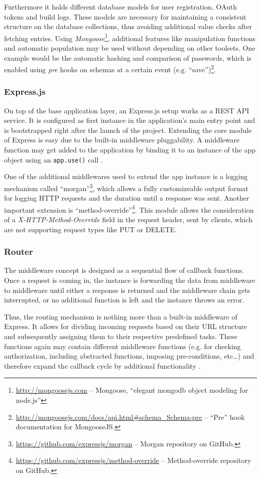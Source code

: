 Furthermore it holds different database models for user registration, OAuth tokens and build logs. These models are necessary for maintaining a consistent structure on the database collections, thus avoiding additional value checks after fetching entries. Using \emph{Mongoose}\footnote{\url{http://mongoosejs.com} -- Mongoose, ``elegant mongodb object modeling for node.js''}, additional features like manipulation functions and automatic population may be used without depending on other toolsets. One example would be the automatic hashing and comparison of passwords, which is enabled using \emph{pre} hooks on schemas at a certain event (e.g. ``save'')\footnote{\url{http://mongoosejs.com/docs/api.html\#schema_Schema-pre} -- ``Pre'' hook documentation for MongooseJS.}.

\subsubsection{Express.js}
On top of the base application layer, an Express.js setup works as a REST API service. It is configured as first instance in the application's main entry point and is bootstrapped right after the launch of the project. Extending the core module of Express is easy due to the built-in middleware pluggability. A middleware function may get added to the application by binding it to an instance of the app object using an \texttt{app.use()} call \cite{ExpressMiddleware}.

One of the additional middlewares used to extend the app instance is a logging mechanism called ``morgan''\footnote{\url{https://github.com/expressjs/morgan} -- Morgan repository on GitHub.}, which allows a fully customizeable output format for logging HTTP requests and the duration until a response was sent. Another important extension is ``method-override''\footnote{\url{https://github.com/expressjs/method-override} -- Method-override repository on GitHub.}. This module allows the consideration of a \emph{X-HTTP-Method-Override} field in the request header, sent by clients, which are not supporting request types like PUT or DELETE.

\subsubsection{Router}
The middleware concept is designed as a sequential flow of callback functions. Once a request is coming in, the instance is forwarding the data from middleware to middleware until either a response is returned and the middleware chain gets interrupted, or no additional function is left and the instance throws an error.

Thus, the routing mechanism is nothing more than a built-in middleware of Express. It allows for dividing incoming requests based on their URL structure and subsequently assigning them to their respective predefined tasks. These functions again may contain different middleware functions (e.g. for checking authorization, including abstracted functions, imposing pre-conditions, etc\ldots) and therefore expand the callback cycle by additional functionality \cite{ExpressRouter}.
